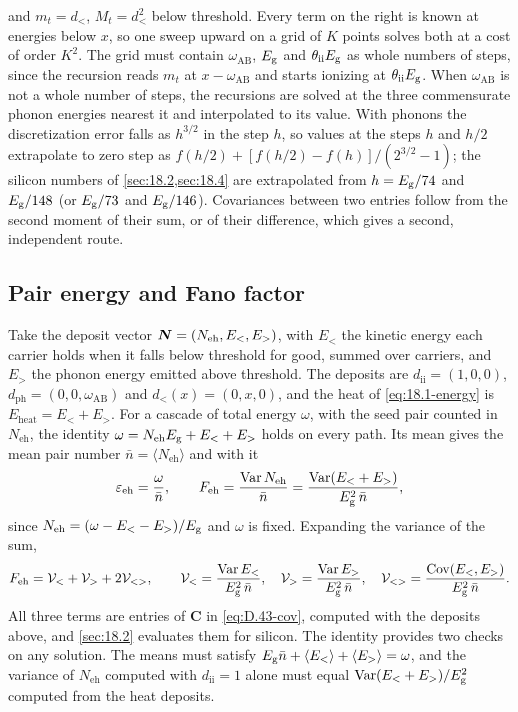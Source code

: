 and $m_t = d_<$, $M_t = d_<^2$ below threshold. Every term on the right is known at energies below $x$, so one sweep upward on a grid of $K$ points solves both at a cost of order $K^2$. The grid must contain $\omega_{\mathrm{AB}}$, $E_{\mathrm{g}}$ and $\theta_{\mathrm{ii}}E_{\mathrm{g}}$ as whole numbers of steps, since the recursion reads $m_t$ at $x - \omega_{\mathrm{AB}}$ and starts ionizing at $\theta_{\mathrm{ii}}E_{\mathrm{g}}$. When $\omega_{\mathrm{AB}}$ is not a whole number of steps, the recursions are solved at the three commensurate phonon energies nearest it and interpolated to its value. With phonons the discretization error falls as $h^{3/2}$ in the step $h$, so values at the steps $h$ and $h/2$ extrapolate to zero step as $f(h/2) + [f(h/2) - f(h)]/(2^{3/2} - 1)$; the silicon numbers of \cref{sec:18.2,sec:18.4} are extrapolated from $h = E_{\mathrm{g}}/74$ and $E_{\mathrm{g}}/148$ (or $E_{\mathrm{g}}/73$ and $E_{\mathrm{g}}/146$). Covariances between two entries follow from the second moment of their sum, or of their difference, which gives a second, independent route.

\subsection{Pair energy and Fano factor}

Take the deposit vector $\bm{N} = (N_{\mathrm{eh}}, E_<, E_>)$, with $E_<$ the kinetic energy each carrier holds when it falls below threshold for good, summed over carriers, and $E_>$ the phonon energy emitted above threshold. The deposits are $d_{\mathrm{ii}} = (1, 0, 0)$, $d_{\mathrm{ph}} = (0, 0, \omega_{\mathrm{AB}})$ and $d_<(x) = (0, x, 0)$, and the heat of \cref{eq:18.1-energy} is $E_{\mathrm{heat}} = E_< + E_>$. For a cascade of total energy $\omega$, with the seed pair counted in $N_{\mathrm{eh}}$, the identity $\omega = N_{\mathrm{eh}}E_{\mathrm{g}} + E_< + E_>$ holds on every path. Its mean gives the mean pair number $\bar n = \langle N_{\mathrm{eh}}\rangle$ and with it
\begin{equation}
  \varepsilon_{\mathrm{eh}} = \frac{\omega}{\bar n} , \qquad
  F_{\mathrm{eh}} = \frac{\operatorname{Var}N_{\mathrm{eh}}}{\bar n} = \frac{\operatorname{Var}(E_< + E_>)}{E_{\mathrm{g}}^2\,\bar n} ,
  \label{eq:D.43-moments}
\end{equation}
since $N_{\mathrm{eh}} = (\omega - E_< - E_>)/E_{\mathrm{g}}$ and $\omega$ is fixed. Expanding the variance of the sum,
\begin{equation}
  F_{\mathrm{eh}} = \mathcal{V}_< + \mathcal{V}_> + 2\mathcal{V}_{<>} , \qquad
  \mathcal{V}_< = \frac{\operatorname{Var}E_<}{E_{\mathrm{g}}^2\,\bar n} , \quad
  \mathcal{V}_> = \frac{\operatorname{Var}E_>}{E_{\mathrm{g}}^2\,\bar n} , \quad
  \mathcal{V}_{<>} = \frac{\operatorname{Cov}(E_<,E_>)}{E_{\mathrm{g}}^2\,\bar n} .
  \label{eq:D.43-decomp}
\end{equation}
All three terms are entries of $\mathbf{C}$ in \cref{eq:D.43-cov}, computed with the deposits above, and \cref{sec:18.2} evaluates them for silicon. The identity provides two checks on any solution. The means must satisfy $E_{\mathrm{g}}\bar n + \langle E_<\rangle + \langle E_>\rangle = \omega$, and the variance of $N_{\mathrm{eh}}$ computed with $d_{\mathrm{ii}} = 1$ alone must equal $\operatorname{Var}(E_< + E_>)/E_{\mathrm{g}}^2$ computed from the heat deposits.
